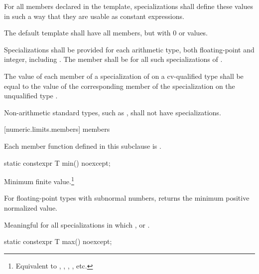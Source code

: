 \pnum
For all members declared
 
in the
template, specializations shall define these values in such a way
that they are usable as
constant expressions.

\pnum
The default
template shall have all members, but with 0 or
values.

\pnum
Specializations shall be provided for each
arithmetic type,
both floating-point and integer, including
.
The member
shall be
for all such specializations of
.

\pnum
The value of each member of a specialization of
 on a cv-qualified type
 shall be equal to the value of the corresponding member of
the specialization on the unqualified type .

\pnum
Non-arithmetic standard types, such as
, shall not have specializations.

[numeric.limits.members]{ members}

\pnum
{}%
Each member function defined in this subclause is .

%
\begin{itemdecl}
static constexpr T min() noexcept;
\end{itemdecl}

\begin{itemdescr}
\pnum
Minimum finite value.\footnote{Equivalent to , ,
, , etc.}

%
\pnum
For floating-point types with subnormal numbers, returns the minimum positive
normalized value.

\pnum
Meaningful for all specializations in which
,
or
.
\end{itemdescr}

\begin{indexed}{}
\begin{itemdecl}
static constexpr T max() noexcept;
\end{itemdecl}
\end{indexed}

